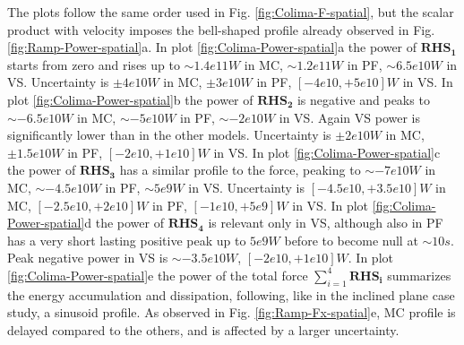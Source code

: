 \documentclass{article}
\begin{document}
The plots follow the same order used in Fig. \ref{fig:Colima-F-spatial}, but the scalar product with velocity imposes the bell-shaped profile already observed in Fig. \ref{fig:Ramp-Power-spatial}a. In plot \ref{fig:Colima-Power-spatial}a the power of $\boldsymbol{RHS_1}$ starts from zero and rises up to $\sim 1.4e11 W$ in MC, $\sim 1.2e11 W$ in PF, $\sim 6.5e10 W$ in VS. Uncertainty is $\pm 4e10 W$ in MC, $\pm 3e10 W$ in PF, $[-4e10,+5e10] W$ in VS. In plot \ref{fig:Colima-Power-spatial}b the power of  $\boldsymbol{RHS_2}$ is negative and peaks to $\sim -6.5e10 W$ in MC, $\sim -5e10 W$ in PF, $\sim -2e10 W$ in VS. Again VS power is significantly lower than in the other models. Uncertainty is $\pm 2e10 W$ in MC, $\pm 1.5e10 W$ in PF, $[-2e10,+1e10] W$ in VS. In plot \ref{fig:Colima-Power-spatial}c the power of $\boldsymbol{RHS_3}$ has a similar profile to the force, peaking to $\sim -7e10 W$ in MC, $\sim -4.5e10 W$ in PF, $\sim 5e9 W$ in VS. Uncertainty is $[-4.5e10,+3.5e10] W$ in MC, $[-2.5e10,+2e10] W$ in PF, $[-1e10,+5e9] W$ in VS. In plot \ref{fig:Colima-Power-spatial}d the power of $\boldsymbol{RHS_4}$ is relevant only in VS, although also in PF has a very short lasting positive peak up to $5e9 W$ before to become null at $\sim 10 s$. Peak negative power in VS is  $\sim -3.5e10 W$, $[-2e10,+1e10] W$. In plot \ref{fig:Colima-Power-spatial}e the power of the total force $\sum^4_{i=1}\boldsymbol{RHS_i}$ summarizes the energy accumulation and dissipation, following, like in the inclined plane case study, a sinusoid profile. As observed in Fig. \ref{fig:Ramp-Fx-spatial}e, MC profile is delayed compared to the others, and is affected by a larger uncertainty.
\end{document}
